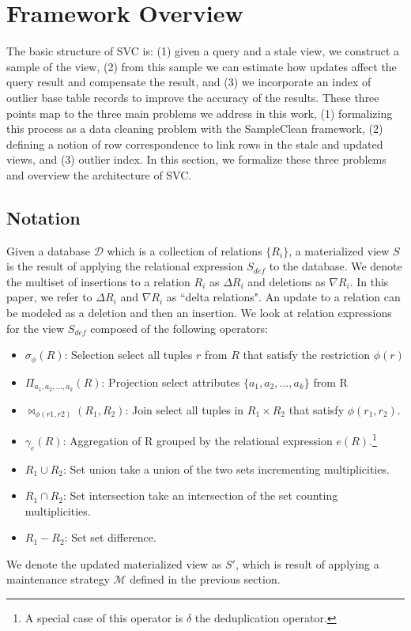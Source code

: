\section{Framework Overview}\label{sec-arch}
The basic structure of SVC is: (1) given a query and a stale view, we construct a sample of the view, (2) from this sample we can estimate how updates affect the query result and compensate the result, and (3) we incorporate an index of outlier base table records to improve the accuracy of the results.
These three points map to the three main problems we address in this work, (1) formalizing this process as a data cleaning problem with the SampleClean framework, (2) defining a notion of row correspondence to link rows in the stale and updated views, and (3) outlier index.
In this section, we formalize these three problems and overview the architecture of SVC.

\subsection{Notation}
Given a database $\mathcal{D}$ which is a collection of relations $\{R_i\}$, a materialized view $S$ is the result of applying the relational expression $S_{def}$ to the database.
We denote the multiset of insertions to a relation $R_i$ as $\Delta R_i$ and deletions as $\nabla R_i$.
In this paper, we refer to $\Delta R_i$ and $\nabla R_i$ as ``delta relations".
An update to a relation can be modeled as a deletion and then an insertion.
We look at relation expressions for the view $S_{def}$ composed of the following operators:
\begin{itemize}\vspace{-.45em}
\item $\sigma_{\phi}(R)$: Selection select all tuples $r$ from $R$ that satisfy the restriction $\phi (r)$ \vspace{-.45em}
\item $\Pi_{a_1,a_2,...,a_k}(R)$: Projection select attributes $\{a_1,a_2,...,a_k\}$ from R \vspace{-.45em}
\item $\bowtie_{\phi (r1,r2)}(R_1,R_2)$: Join select all tuples in $R_1 \times R_2$ that satisfy $\phi (r_1,r_2)$.
\item $\gamma_{e}(R)$: Aggregation of R grouped by the relational expression $e(R)$.\footnote{A special case of this operator is $\delta$ the deduplication operator.}\vspace{-.45em}
\item $R_1 \cup R_2$: Set union take a union of the two sets incrementing multiplicities.
\item $R_1 \cap R_2$: Set intersection take an intersection of the set counting multiplicities.
\item $R_1 - R_2$: Set set difference.
\end{itemize}
We denote the updated materialized view as $S'$, which is result of applying a maintenance strategy $\mathcal{M}$ defined in the previous section.

